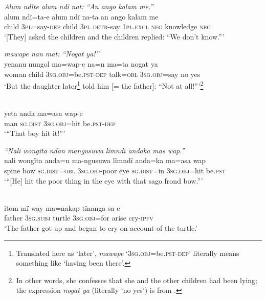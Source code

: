 \ex \negmedspace \textit{Alum ndïte alum ndï} {\textit{nat:}} \textit{“An ango kalam me.”}\\
\gll alum  ndï{=}ta-e    alum  ndï  {na-ta} an      ango  kalam me\\
child  3\textsc{pl}=say-\textsc{dep}  child  3\textsc{pl}  \textsc{detr}{}-say  1\textsc{pl.excl}  \textsc{neg}  knowledge {\scshape neg}\\
\glt ‘[They] asked the children and the children replied: “We don’t know.”’

\ex {} {\textit{m}}{\textit{awape nan mat: “Nogat ya!”}}\\
\gll yenanu    nungol  {m}a{=}wap{{}-}e        na{=}n    {m}a=ta    nogat {ya}\\
woman    child  3\textsc{sg.obj}=be.\textsc{pst-dep}  talk=\textsc{obl}  \textsc{3sg.obj}=say  no yes\\
\glt ‘But the daughter later\footnote{Translated here as ‘later’, \textit{mawape} ‘3\textsc{sg.obj}=be.\textsc{pst-dep}’ literally means something like ‘having been there’.} told him [= the father]: “Not at all!”’\footnote{In other words, she confesses that she and the other children had been lying; the expression \textit{nogat ya} (literally ‘no yes’) is from .}

\ex {}\\
\gll yeta  {a}nda    ma=asa    wap{{}-}e\\
man  \textsc{sg.dist}  3\textsc{sg.obj}=hit  be.\textsc{pst-dep}\\
\glt ‘“That boy hit it!”’

\ex \negmedspace \textit{“Nali} {\textit{wongïta ndan mangusuwa}} \textit{lïmnd}{\textit{ï anda}}\textit{ka mas wap.”}\\
\gll nali  wongïta  anda=n    ma-ngusuwa lïmndï  anda=ka ma=asa    wap\\
spine  bow    \textsc{sg.dist=obl}  \textsc{3sg.obj-}poor    eye    \textsc{sg.dist}=in 3\textsc{sg.obj}=hit  be.\textsc{pst}\\
\glt ‘“{[He] hit the poor thing in the eye with that sago frond bow.”}’

\ex {}\\
\gll itom  mï      way  ma{=}nakap    tïnanga  sa-e\\
father  3\textsc{sg.subj}  turtle  3\textsc{sg.obj=}for  arise  cry-\textsc{ipfv}\\
\glt ‘The father got up and began to cry on account of the turtle.’

